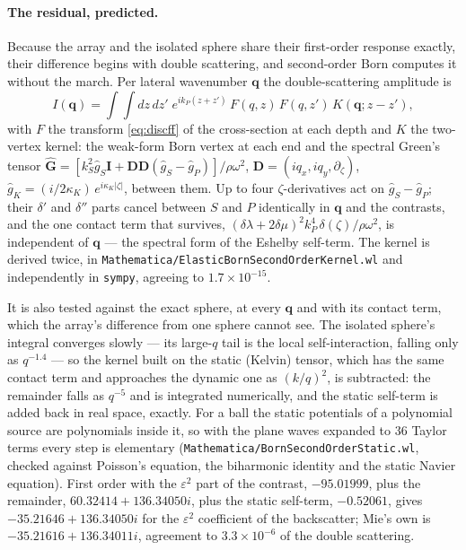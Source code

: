 \documentclass[11pt,a4paper]{article}
\begin{document}
\paragraph{The residual, predicted.}  Because the array and the isolated sphere
share their first-order response exactly, their difference begins with double
scattering, and second-order Born computes it without the march.  Per lateral
wavenumber $\mathbf{q}$ the double-scattering amplitude is
\begin{equation}\label{eq:born2q}
  I(\mathbf{q}) = \int\!\!\int dz\,dz'\;
     e^{ik_P(z+z')}\,F(q,z)\,F(q,z')\,K(\mathbf{q};z-z'),
\end{equation}
with $F$ the transform \eqref{eq:discff} of the cross-section at each depth and
$K$ the two-vertex kernel: the weak-form Born vertex at each end and the
spectral Green's tensor
$\hat{\mathbf{G}} = [k_S^2\hat g_S\mathbf{I} + \mathbf{D}\mathbf{D}(\hat g_S-\hat
g_P)]/\rho\omega^2$, $\mathbf{D}=(iq_x,iq_y,\partial_\zeta)$,
$\hat g_K=(i/2\kappa_K)\,e^{i\kappa_K|\zeta|}$, between them.  Up to four
$\zeta$-derivatives act on $\hat g_S-\hat g_P$; their $\delta'$ and $\delta''$
parts cancel between $S$ and $P$ identically in $\mathbf{q}$ and the
contrasts, and the one contact term that survives,
$(\delta\lambda+2\delta\mu)^2k_P^4\,\delta(\zeta)/\rho\omega^2$, is independent
of $\mathbf{q}$ --- the spectral form of the Eshelby self-term.  The kernel is
derived twice, in \texttt{Mathematica/ElasticBornSecondOrderKernel.wl} and
independently in \texttt{sympy}, agreeing to $1.7\times10^{-15}$.

It is also tested against the exact sphere, at every $\mathbf{q}$ and with its
contact term, which the array's difference from one sphere cannot see.  The
isolated sphere's integral converges slowly --- its large-$q$ tail is the local
self-interaction, falling only as $q^{-1.4}$ --- so the kernel built on the static
(Kelvin) tensor, which has the same contact term and approaches the dynamic one
as $(k/q)^2$, is subtracted: the remainder falls as $q^{-5}$ and is integrated
numerically, and the static self-term is added back in real space, exactly.
For a ball the static potentials of a polynomial source are polynomials inside
it, so with the plane waves expanded to $36$ Taylor terms every step is
elementary (\texttt{Mathematica/BornSecondOrderStatic.wl}, checked against
Poisson's equation, the biharmonic identity and the static Navier equation).
First order with the $\varepsilon^2$ part of the contrast, $-95.01999$, plus the
remainder, $60.32414+136.34050i$, plus the static self-term, $-0.52061$, gives
$-35.21646+136.34050i$ for the $\varepsilon^2$ coefficient of the backscatter;
Mie's own is $-35.21616+136.34011i$, agreement to $3.3\times10^{-6}$ of the
double scattering.
\end{document}
